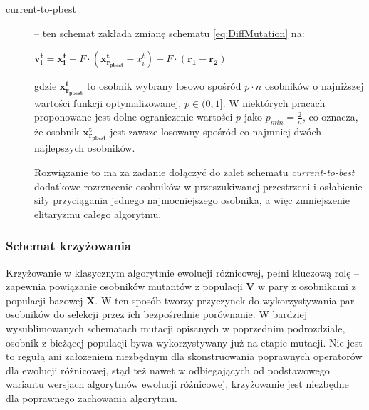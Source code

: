 \documentclass[12pt,a4paper]{report}
\begin{document}
{{{{\begin{description}
\item[current-to-pbest] \cite{JADE} -- ten schemat zakłada zmianę schematu \ref{eq:DiffMutation} na:

\begin{center}
 $\mathbf{v_i^{t}} = \mathbf{x_i^t} + F \cdot (\mathbf{x_{r_{pbest}}^t} - x_i^t) + F \cdot (\mathbf{r_1} - \mathbf{r_{2}})$
\end{center}
gdzie $\mathbf{x_{r_{pbest}}^t}$ to osobnik wybrany losowo spośród $p \cdot n$ osobników o najniższej wartości funkcji optymalizowanej, $p \in (0,1]$. W niektórych pracach \cite{SHADE} proponowane jest dolne ograniczenie wartości $p$ jako $p_{min} = \frac{2}{n}$, co oznacza, że osobnik $\mathbf{x_{r_{pbest}}^t}$ jest zawsze losowany spośród co najmniej dwóch najlepszych osobników.

Rozwiązanie to ma za zadanie dołączyć do zalet schematu \emph{current-to-best} dodatkowe rozrzucenie osobników w przeszukiwanej przestrzeni i osłabienie siły przyciągania jednego najmocniejszego osobnika, a więc zmniejszenie elitaryzmu całego algorytmu.




\end{description}
}
\subsubsection{Schemat krzyżowania}
\par{
Krzyżowanie w klasycznym algorytmie ewolucji różnicowej, pełni kluczową rolę -- zapewnia powiązanie osobników mutantów z populacji $\mathbf{V}$ w pary z osobnikami z populacji bazowej $\mathbf{X}$. W ten sposób tworzy przyczynek do wykorzystywania par osobników do selekcji przez ich bezpośrednie porównanie. W bardziej wysublimowanych schematach mutacji opisanych w poprzednim podrozdziale, osobnik z bieżącej populacji bywa wykorzystywany już na etapie mutacji. Nie jest to regułą ani założeniem niezbędnym dla skonstruowania poprawnych operatorów dla ewolucji różnicowej, stąd też nawet w odbiegających od podstawowego wariantu wersjach algorytmów ewolucji różnicowej, krzyżowanie jest niezbędne dla poprawnego zachowania algorytmu.
}

}}}
\end{document}
